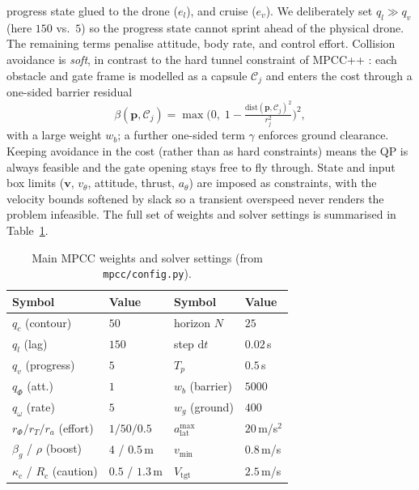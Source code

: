 \documentclass[conference]{IEEEtran}
\begin{document}
progress state glued to the drone ($e_l$), and cruise ($e_v$). We deliberately
set $q_l\!\gg\! q_v$ (here $150$ vs.\ $5$) so the progress state cannot sprint
ahead of the physical drone. The remaining terms penalise attitude, body rate,
and control effort. Collision avoidance is \emph{soft}, in contrast to the hard tunnel constraint of MPCC++ \cite{krinner2024mpccpp}: each obstacle and gate
frame is modelled as a capsule $\mathcal{C}_j$ and enters the cost through a
one-sided barrier residual
\begin{equation}
  \beta(\mathbf{p},\mathcal{C}_j)=
  \max\!\Big(0,\;1-\tfrac{\mathrm{dist}(\mathbf{p},\mathcal{C}_j)^2}{r_j^2}\Big)^2,
  \label{eq:barrier}
\end{equation}
with a large weight $w_b$; a further one-sided term $\gamma$ enforces ground
clearance. Keeping avoidance in the cost (rather than as hard constraints) means
the QP is always feasible and the gate opening stays free to fly through. State
and input box limits ($\mathbf{v}$, $v_\theta$, attitude, thrust, $a_\theta$)
are imposed as constraints, with the velocity bounds softened by slack so a
transient overspeed never renders the problem infeasible. The full set of weights
and solver settings is summarised in Table~\ref{tab:params}.

\begin{table}[t]
\centering
\caption{Main MPCC weights and solver settings (from
\texttt{mpcc/config.py}).}
\label{tab:params}
\begin{tabular}{llll}
\toprule
Symbol & Value & Symbol & Value\\
\midrule
$q_c$ (contour) & $50$ & horizon $N$ & $25$\\
$q_l$ (lag) & $150$ & step $\mathrm{d}t$ & $0.02$\,s\\
$q_v$ (progress) & $5$ & $T_p$ & $0.5$\,s\\
$q_\Phi$ (att.) & $1$ & $w_b$ (barrier) & $5000$\\
$q_\omega$ (rate) & $5$ & $w_g$ (ground) & $400$\\
$r_\Phi/r_T/r_a$ (effort) & $1/50/0.5$ & $a_{\mathrm{lat}}^{\max}$ & $20$\,m/s$^2$\\
$\beta_g$ / $\rho$ (boost) & $4$ / $0.5$\,m & $v_{\min}$ & $0.8$\,m/s\\
$\kappa_c$ / $R_c$ (caution) & $0.5$ / $1.3$\,m & $V_{\mathrm{tgt}}$ & $2.5$\,m/s\\
\bottomrule
\end{tabular}
\end{table}
\end{document}
